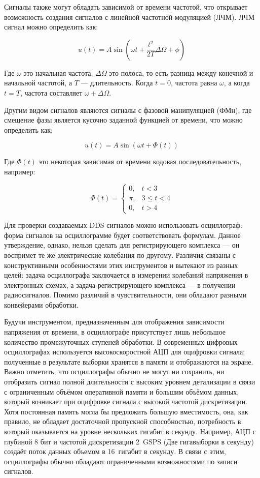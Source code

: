 \documentclass{report}
\begin{document}
Сигналы также могут обладать зависимой от времени частотой, что открывает возможность создания сигналов с линейной частотной модуляцией (ЛЧМ). ЛЧМ сигнал можно определить как:

$$
u(t) = A \sin (\omega t + \frac{t^2}{2T} \Delta \Omega + \phi)
$$

Где $\omega$ это начальная частота, $\Delta \Omega$ это полоса, то есть разница между конечной и начальной частотой, а $T$ --- длительность. Когда $t=0$, частота равна $\omega$, а когда $t=T$, частота составляет $\omega + \Delta \Omega$.

Другим видом сигналов являются сигналы с фазовой манипуляцией (ФМн), где смещение фазы является кусочно заданной функцией от времени, что можно определить как:

$$
u(t) = A \sin (\omega t + \Phi(t))
$$

Где $\Phi(t)$ это некоторая зависимая от времени кодовая последовательность, например:

$$
\Phi(t) =
\begin{cases}
0, & t < 3 \\
\pi, & 3 \le t < 4 \\
0, & t > 4
\end{cases}
$$

Для проверки создаваемых DDS сигналов можно использовать осциллограф: форма сигналов на осциллограмме будет соответствовать формулам. Данное утверждение, однако, нельзя сделать для регистрирующего комплекса --- он воспримет те же электрические колебания по другому. Различия связаны с конструктивными особенностями этих инструментов и вытекают из разных целей: задача осциллографа заключается в измерении колебаний напряжения в электронных схемах, а задача регистрирующего комплекса --- в получении радиосигналов. Помимо различий в чувствительности, они обладают разными конвейерами обработки.

Будучи инструментом, предназначенным для отображения зависимости напряжения от времени, в осциллографе присутствует лишь небольшое количество промежуточных ступеней обработки. В современных цифровых осциллографах используется высокоскоростной АЦП для оцифровки сигнала; полученные в результате выборки хранятся в памяти и отображаются на экране. Важно отметить, что осциллографы обычно не могут ни сохранить, ни отобразить сигнал полной длительности с высоким уровнем детализации в связи с ограниченным объёмом оперативной памяти и большим объёмом данных, который возникает при оцифровке сигнала с высокой частотой дискретизации. Хотя постоянная память могла бы предложить большую вместимость, она, как правило, не обладает достаточной пропускной способностью, потребность в который оказывается на уровне нескольких гигабит в секунду. Например, АЦП с глубиной 8 бит и частотой дискретизации 2~GSPS (Две гигавыборки в секунду) создаёт поток данных объемом в 16~гигабит в секунду. В связи с этим, осциллографы обычно обладают ограниченными возможностями по записи сигналов.
\end{document}
